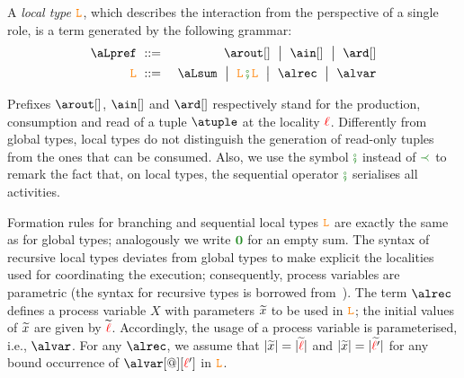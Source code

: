 %

A {\em local type} $\texttt{\textcolor{orange}L}$, which describes the interaction from the
perspective of a single role, is a term generated by the following
grammar:
%
\begin{eqnarray*}
  \aLpref & \bnfdef &
                  \arout[]\bnfmid
                  \ain[] \bnfmid
                  \ard[] 
\\
  \aL & \bnfdef &
                  \aLsum \bnfmid
                  \aL \lseqop \aL \bnfmid
                   \alrec \bnfmid
  	        \alvar%
\end{eqnarray*}

Prefixes $\arout[]$, $\ain[]$ and $\ard[]$ respectively stand for the
production, consumption and read of a tuple $\atuple$ at the locality
${\color{red}\ell}$. Differently from global types, local types do not
distinguish the generation of read-only tuples from the ones that can
be consumed.
%
Also, we use the symbol $\lseqop$ instead of $\seqop$ to remark the fact that,
on local types, the sequential operator $\lseqop$ serialises all activities.

Formation rules for branching and sequential local types $\texttt{\textcolor{orange}L}$ are
exactly the same as for global types; analogously we write $\nil$ for
an empty sum.  The syntax of recursive local types deviates from
global types to make explicit the localities used for coordinating the
execution; consequently, process variables are parametric (the syntax
for recursive types is borrowed from~\cite{bhty10}).  The term $\alrec$
defines a process variable $X$ with parameters $\widetilde{x}$ to be used in
$\texttt{\textcolor{orange}L}$; the initial values of $\widetilde{x}$ are given by
$\widetilde{{\color{red}\ell}}$. Accordingly, the usage of a process variable is
parameterised, i.e., $\alvar$.  For any $\alrec$, we assume that
$|\widetilde{x}| = |\widetilde{{\color{red}\ell}}|$ and $|\widetilde{x}| = |\widetilde{{\color{red}\ell}'}|$ for
any bound occurrence of $\alvar[@][\alocvar']$ in $\texttt{\textcolor{orange}L}$.



